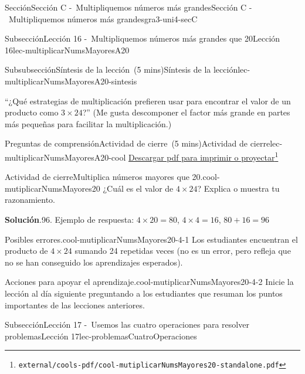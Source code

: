 \documentclass[oneside,10pt,]{article}
\newcommand{\blocktitlefont}{\relax}
\begin{document}
\begin{sectionptx}{Sección}{Sección C -~Multipliquemos números más grandes}{}{Sección C -~Multipliquemos números más grandes}{}{}{gra3-uni4-secC}
\begin{subsectionptx}{Subsección}{Lección 16 -~Multipliquemos números más grandes que 20}{}{Lección 16}{}{}{lec-multiplicarNumsMayoresA20}
\begin{subsubsectionptx}{Subsubsección}{Síntesis de la lección~(5 mins)}{}{Síntesis de la lección}{}{}{lec-multiplicarNumsMayoresA20-sintesis}
\par
``¿Qué estrategias de multiplicación prefieren usar para encontrar el valor de un producto como \(3 \times 24\)?'' (Me gusta descomponer el factor más grande en partes más pequeñas para facilitar la multiplicación.)%
\end{subsubsectionptx}
%
%
\typeout{************************************************}
\typeout{************************************************}
%
\begin{reading-questions-subsubsection}{Preguntas de comprensión}{Actividad de cierre~(5 mins)}{}{Actividad de cierre}{}{}{lec-multiplicarNumsMayoresA20-cool}
\href{external/cools-pdf/cool-mutiplicarNumsMayores20-standalone.pdf}{Descargar pdf para imprimir o proyectar}\footnote{\nolinkurl{external/cools-pdf/cool-mutiplicarNumsMayores20-standalone.pdf}\label{lec-multiplicarNumsMayoresA20-cool-5}}\begin{project}{Actividad de cierre}{Multiplica números mayores que 20.}{cool-mutiplicarNumsMayores20}%
¿Cuál es el valor de \(4\times 24\)? Explica o muestra tu razonamiento.%
\par\smallskip%
\noindent\textbf{\blocktitlefont Solución}.\hypertarget{cool-mutiplicarNumsMayores20-3}{}\quad{}96. Ejemplo de respuesta: \(4 \times 20 = 80\), \(4 \times 4 = 16\), \(80 + 16 = 96\)%
\end{project}%
\par
\begin{paragraphs}{Posibles errores.}{cool-mutiplicarNumsMayores20-4-1}%
Los estudiantes encuentran el producto de \(4 \times 24\) sumando 24 repetidas veces (no es un error, pero refleja que no se han conseguido los aprendizajes esperados).%
\end{paragraphs}%
\begin{paragraphs}{Acciones para apoyar el aprendizaje.}{cool-mutiplicarNumsMayores20-4-2}%
Inicie la lección al día siguiente preguntando a los estudiantes que resuman los puntos importantes de las lecciones anteriores.%
\end{paragraphs}%
\end{reading-questions-subsubsection}
\end{subsectionptx}
%
%
\typeout{************************************************}
\typeout{************************************************}
%
\begin{subsectionptx}{Subsección}{Lección 17 -~Usemos las cuatro operaciones para resolver problemas}{}{Lección 17}{}{}{lec-problemasCuatroOperaciones}

\end{subsectionptx}
\end{sectionptx}
\end{document}
